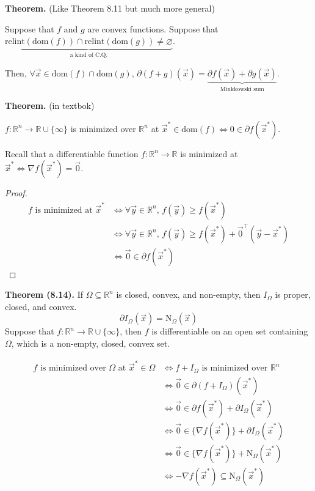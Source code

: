 \documentclass{article}
\newcommand{\R}{\mathbb{R}}             %
\newcommand{\x}{\vec{x}}
\newcommand{\dom}{\text{dom}}           %
\newcommand{\relint}{\text{relint}}     %
\begin{document}
\textbf{Theorem.} (Like Theorem 8.11 but much more general)

Suppose that $f$ and $g$ are convex functions. Suppose that $\underbrace{\relint(\dom(f)) \cap \relint(\dom(g)) \neq \varnothing}_{\text{a kind of C.Q.}}$.

Then, $\forall \x \in \dom(f) \cap \dom(g)$, $\partial (f + g)(\x) = \underbrace{\partial f(\x) + \partial g(\x)}_{\text{Minkkowski sum}}$.

\textbf{Theorem.} (in textbok)

$f \colon \R^n \to \R \cup \{\infty\}$ is minimized over $\R^n$ at $\x^* \in \dom(f) \iff 0 \in \partial f(\x^*)$.

Recall that a differentiable function $f \colon \R^n \to \R$ is minimized at $\x^* \iff \nabla f(\x^*) = \vec{0}$.

\begin{proof}
    \begin{align*}
        f \text{ is minimized at } \x^* &\iff \forall \vec{y} \in \R^n,\, f(\vec{y}) \geq f(\x^*) \\
        &\iff \forall \vec{y} \in \R^n,\, f(\vec{y}) \geq f(\x^*) + \vec{0}^\top(\vec{y} - \x^*) \\
        &\iff \vec{0} \in \partial f(\x^*)
    \end{align*}
\end{proof}

\textbf{Theorem (8.14).} If $\Omega \subseteq \R^n$ is closed, convex, and non-empty, then $I_\Omega$ is proper, closed, and convex.
\[
    \partial I_\Omega(\x) = \text{N}_\Omega(\x)
\]
Suppose that $f \colon \R^n \to \R \cup \{\infty\}$, then $f$ is differentiable on an open set containing $\Omega$, which is a non-empty, closed, convex set.

\begin{align*}
    f \text{ is minimized over } \Omega \text{ at } \x^* \in \Omega &\iff f + I_\Omega \text{ is minimized over } \R^n \\
    &\iff \vec{0} \in \partial(f + I_\Omega)(\x^*) \tag{by previous theorem} \\
    &\iff \vec{0} \in \partial f(\x^*) + \partial I_\Omega(\x^*) \tag{C.Q. holds} \\
    &\iff \vec{0} \in \{\nabla f(\x^*)\} + \partial I_\Omega(\x^*) \\
    &\iff \vec{0} \in \{\nabla f(\x^*)\} + \text{N}_\Omega(\x^*) \\
    &\iff -\nabla f(\x^*) \subseteq \text{N}_\Omega(\x^*) \tag{new proof of earlier theorem}
\end{align*}
\end{document}
